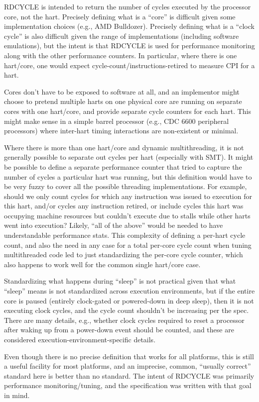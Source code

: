 \begin{commentary}
RDCYCLE is intended to return the number of cycles executed by the
processor core, not the hart.  Precisely defining what is a ``core'' is
difficult given some implementation choices (e.g., AMD Bulldozer).
Precisely defining what is a ``clock cycle'' is also difficult given the
range of implementations (including software emulations), but the
intent is that RDCYCLE is used for performance monitoring along with the
other performance counters.  In particular, where there is one
hart/core, one would expect cycle-count/instructions-retired to
measure CPI for a hart.

Cores don't have to be exposed to software at all, and an implementor
might choose to pretend multiple harts on one physical core are
running on separate cores with one hart/core, and provide separate
cycle counters for each hart.  This might make sense in a simple
barrel processor (e.g., CDC 6600 peripheral processors) where
inter-hart timing interactions are non-existent or minimal.

Where there is more than one hart/core and dynamic multithreading, it
is not generally possible to separate out cycles per hart (especially
with SMT).  It might be possible to define a separate performance
counter that tried to capture the number of cycles a particular hart
was running, but this definition would have to be very fuzzy to cover
all the possible threading implementations.  For example, should we
only count cycles for which any instruction was issued to execution
for this hart, and/or cycles any instruction retired, or include
cycles this hart was occupying machine resources but couldn't execute
due to stalls while other harts went into execution? Likely, ``all of
the above'' would be needed to have understandable performance stats.
This complexity of defining a per-hart cycle count, and also the need
in any case for a total per-core cycle count when tuning multithreaded
code led to just standardizing the per-core cycle counter, which also
happens to work well for the common single hart/core case.

Standardizing what happens during ``sleep'' is not practical given
that what ``sleep'' means is not standardized across execution
environments, but if the entire core is paused (entirely clock-gated
or powered-down in deep sleep), then it is not executing clock cycles,
and the cycle count shouldn't be increasing per the spec.  There are
many details, e.g., whether clock cycles required to reset a processor
after waking up from a power-down event should be counted, and these
are considered execution-environment-specific details.

Even though there is no precise definition that works for all
platforms, this is still a useful facility for most platforms, and an
imprecise, common, ``usually correct'' standard here is better than no
standard.  The intent of RDCYCLE was primarily performance
monitoring/tuning, and the specification was written with that goal in
mind.
\end{commentary}

